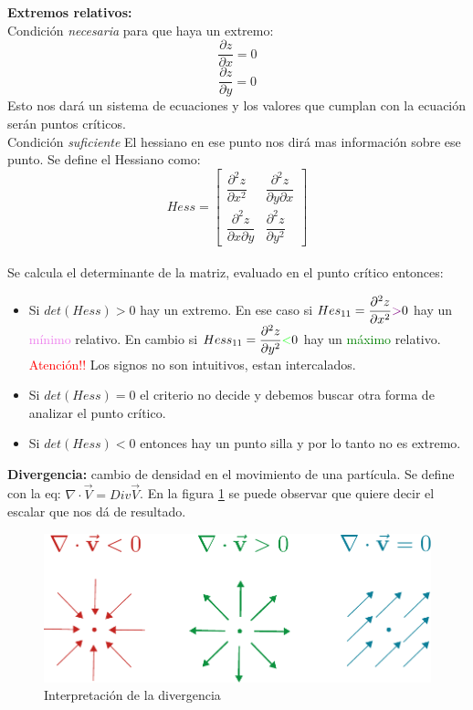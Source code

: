 \documentclass[12pt,a4paper]{article}
\begin{document}
\textbf{Extremos relativos:}\\
Condición \textit{necesaria} para que haya un extremo:
$$\dfrac{\partial z}{\partial x}=0$$
$$\dfrac{\partial z}{\partial y}= 0$$
Esto nos dará un sistema de ecuaciones y los valores que cumplan con la ecuación serán puntos críticos.\\
Condición \textit{suficiente} El hessiano en ese punto nos dirá mas información sobre ese punto. Se define el Hessiano como:\\
$$
Hess =
\begin{bmatrix}
\dfrac{\partial ^2 z}{\partial x^2 } &  \dfrac{\partial ^2 z}{\partial y \partial x} \\
\dfrac{\partial ^2 z}{\partial x \partial y} & \dfrac{\partial ^2 z}{\partial y^2}
\end{bmatrix}
$$
\\
Se calcula el determinante de la matriz, evaluado en el punto crítico entonces:
\begin{itemize}
\item Si $det(Hess) > 0$ hay un extremo.  En ese caso si $Hes_{11} = \dfrac{\partial ^2 z}{\partial x^2} \textcolor{violet}{>} 0$ hay un \textcolor{violet}{mínimo} relativo.  En cambio si $Hess_{11} =  \dfrac{\partial ^2 z}{\partial y^2} \textcolor{green}{<} 0$ hay un \textcolor{green}{máximo} relativo. \textcolor{red}{Atención!!} Los signos no son intuitivos, estan intercalados.

\item Si $det(Hess) = 0$ el criterio no decide y debemos buscar otra forma de analizar el punto crítico.

\item Si $det(Hess) < 0$ entonces hay un punto silla y por lo tanto no es extremo.
\end{itemize}

\textbf{Divergencia:} cambio de densidad en el movimiento de una partícula. Se define con la eq:
 $ \nabla  \cdot \vec{V} = Div \vec{V}$. En la figura \ref{fig:divergencia} se puede observar que quiere decir el escalar que nos dá de resultado.\\

 \begin{figure}[htbp]
   \begin{center}
       \includegraphics[scale=0.8]{divergencia.pdf}
     \caption{Interpretación de la divergencia}
     \label{fig:divergencia}
   \end{center}
 \end{figure}
\end{document}
